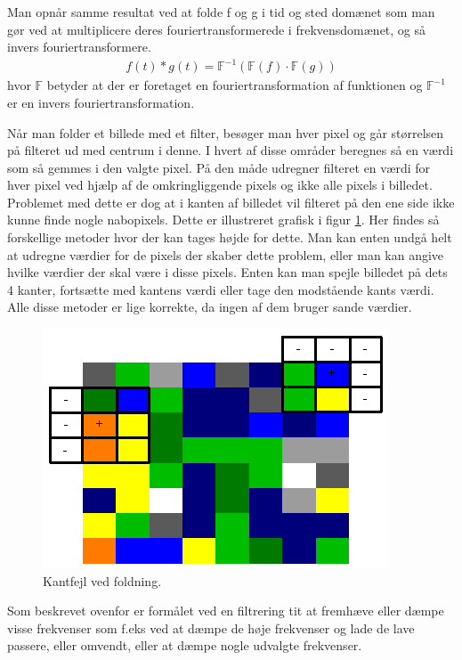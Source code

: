 Man opnår samme resultat ved at folde f og g i tid og sted domænet som man gør ved at multiplicere deres fouriertransformerede i frekvensdomænet, og så invers fouriertransformere.
\begin{align}
	f(t)*g(t) = \mathbb{F}^{-1}(\mathbb{F}(f)\cdot\mathbb{F}(g))
\end{align}
hvor $\mathbb{F}$ betyder at der er foretaget en fouriertransformation af funktionen og $\mathbb{F}^{-1}$ er en invers fouriertransformation.

Når man folder et billede med et filter, besøger man hver pixel og går størrelsen på filteret ud med centrum i denne. I hvert af disse områder beregnes så en værdi som så gemmes i den valgte pixel. På den måde udregner filteret en værdi for hver pixel ved hjælp af de omkringliggende pixels og ikke alle pixels i billedet. Problemet med dette er dog at i kanten af billedet vil filteret på den ene side ikke kunne finde nogle nabopixels. Dette er illustreret grafisk i figur \ref{fig:bildbeh_conv_edge_error}. Her findes så forskellige metoder hvor der kan tages højde for dette. Man kan enten undgå helt at udregne værdier for de pixels der skaber dette problem, eller man kan angive hvilke værdier der skal være i disse pixels. Enten kan man spejle billedet på dets 4 kanter, fortsætte med kantens værdi eller tage den modstående kants værdi. Alle disse metoder er lige korrekte, da ingen af dem bruger sande værdier. 

\begin{figure}[H]
	\centering
	\includegraphics[scale=1]{files/bildbeh/img/conv_edge_error.png}
	\caption{Kantfejl ved foldning.\label{fig:bildbeh_conv_edge_error}}
\end{figure}

Som beskrevet ovenfor er formålet ved en filtrering tit at fremhæve eller dæmpe visse frekvenser som f.eks ved at dæmpe de høje frekvenser og lade de lave passere, eller omvendt, eller at dæmpe nogle udvalgte frekvenser. 

